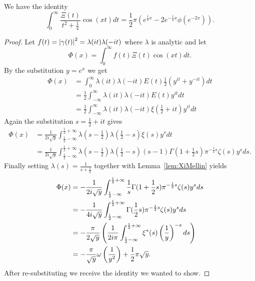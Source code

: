 \begin{theorem}
	We have the identity
\begin{equation*}	
	\int _0 ^{\infty} \frac{\Xi(t)}{t^2 + \frac{1}{4}} \cos(xt) dt = \frac{1}{2} \pi (e^{\frac{1}{2} x} - 2e^{-\frac{1}{2}x} \phi(e^{-2x})).
\end{equation*}
\end{theorem}
\begin{proof}
	Let $f(t) = \left|\gamma(t)\right|^2 = \lambda(it) \lambda(-it)$ where $\lambda$ is analytic and let
\begin{equation*}
	\Phi(x) = \int _0 ^{\infty} f(t) \Xi(t) \cos(xt) dt.	
\end{equation*}
	By the substitution $y = e^x$ we get
\begin{equation*}
\begin{aligned}
	\Phi(x) 
		&= \int _0 ^\infty \lambda(it) \lambda(-it) E(t) \frac{1}{2}(y^{it} + y^{-it}) dt \\
		&= \frac{1}{2} \int _{-\infty} ^\infty \lambda(it) \lambda(-it) E(t) y^{it} dt \\
		&= \frac{1}{2} \int _{-\infty} ^\infty \lambda(it) \lambda(-it) \xi(\frac{1}{2} + it) y^{it} dt
\end{aligned}
\end{equation*}
	Again the substitution $s = \frac{1}{2} + it$ gives
\begin{equation*}
\begin{aligned}
	\Phi(x) 
		&= \frac{1}{2 i\sqrt{y}} \int _{\frac{1}{2} -\infty} ^{\frac{1}{2} + \infty} \lambda(s - \frac{1}{2}) \lambda(\frac{1}{2} - s) \xi(s) y^{s} dt \\
		&= \frac{1}{2 i\sqrt{y}} \int _{\frac{1}{2} -\infty} ^{\frac{1}{2} + \infty} \lambda(s - \frac{1}{2}) \lambda(\frac{1}{2} - s) (s - 1) \Gamma(1 + \frac{1}{2}s) \pi ^{-\frac{1}{2} s} \zeta(s) y^{s} ds.
\end{aligned}
\end{equation*}
	Finally setting $\lambda(s) = \frac{1}{s + \frac{1}{2}}$ together with Lemma~\ref{lem:XiMellin} yields 
\begin{equation*}
\begin{aligned}
	\Phi(x) 
		&= -\frac{1}{2 i\sqrt{y}} \int _{\frac{1}{2} -\infty} ^{\frac{1}{2} + \infty} \frac{1}{s} \Gamma(1 + \frac{1}{2} s) \pi ^{-\frac{1}{2} s} \zeta(s) y^{s} ds \\
		&= -\frac{1}{4 i\sqrt{y}} \int _{\frac{1}{2} -\infty} ^{\frac{1}{2} + \infty} \Gamma(\frac{1}{2} s) \pi ^{-\frac{1}{2} s} \zeta(s) y^{s} ds \\
		&= -\frac{\pi}{2 \sqrt{y}} \left(\frac{1}{2 i \pi} \int _{\frac{1}{2} -\infty} ^{\frac{1}{2} + \infty} \xi^*(s) \left(\frac{1}{y}\right)^{-s} ds\right) \\
		&= -\frac{\pi}{\sqrt{y}} \omega\left(\frac{1}{y^2}\right) + \frac{1}{2} \pi \sqrt{y}.
\end{aligned}
\end{equation*}
	After re-substituting we receive the identity we wanted to show.
\end{proof}


